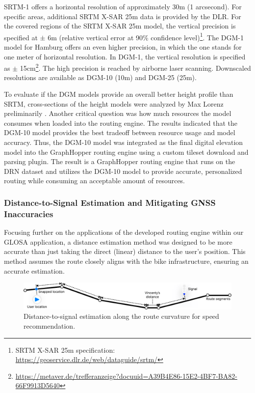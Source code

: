 SRTM-1 offers a horizontal resolution of approximately 30m (1 arcsecond). For specific areas, additional SRTM X-SAR 25m data is provided by the DLR. For the covered regions of the SRTM X-SAR 25m model, the vertical precision is specified at $\pm$ 6m (relative vertical error at 90\% confidence level)\footnote{SRTM X-SAR 25m specification: \url{https://geoservice.dlr.de/web/dataguide/srtm/}}. The DGM-1 model for Hamburg offers an even higher precision, in which the one stands for one meter of horizontal resolution. In DGM-1, the vertical resolution is specified as $\pm$ 15cm\footnote{\url{https://metaver.de/trefferanzeige?docuuid=A39B4E86-15E2-4BF7-BA82-66F9913D5640}}. The high precision is reached by airborne laser scanning. Downscaled resolutions are available as DGM-10 (10m) and DGM-25 (25m).

To evaluate if the DGM models provide an overall better height profile than SRTM, cross-sections of the height models were analyzed by Max Lorenz preliminarily \cite{lorenz_2022}. Another critical question was how much resources the model consumes when loaded into the routing engine. The results indicated that the DGM-10 model provides the best tradeoff between resource usage and model accuracy. Thus, the DGM-10 model was integrated as the final digital elevation model into the GraphHopper routing engine using a custom tileset download and parsing plugin. The result is a GraphHopper routing engine that runs on the DRN dataset and utilizes the DGM-10 model to provide accurate, personalized routing while consuming an acceptable amount of resources. 

\subsubsection{Distance-to-Signal Estimation and Mitigating GNSS Inaccuracies}

Focusing further on the applications of the developed routing engine within our GLOSA application, a distance estimation method was designed to be more accurate than just taking the direct (linear) distance to the user's position. This method assumes the route closely aligns with the bike infrastructure, ensuring an accurate estimation.

\begin{figure}[t]
\centering
\includegraphics[width=\linewidth]{images/distance-to-signal-estimation.pdf}
\caption{Distance-to-signal estimation along the route curvature for speed recommendation.}
\label{fig:distance-to-signal-estimation}
\end{figure}

